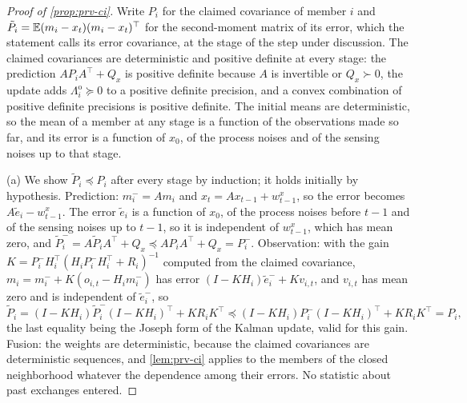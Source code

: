 \begin{proof}[Proof of \cref{prop:prv-ci}]
Write $P_{i}$ for the claimed covariance of member $i$ and $\tilde P_{i}=\mathbb{E}(m_i-x_t)(m_i-x_t)^\top$ for the second-moment matrix of its error, which the statement calls its error covariance, at the stage of the step under discussion. The claimed covariances are deterministic and positive definite at every stage: the prediction $AP_iA^\top+Q_x$ is positive definite because $A$ is invertible or $Q_x\succ0$, the update adds $\Lambda^{\mathrm o}_i\succeq0$ to a positive definite precision, and a convex combination of positive definite precisions is positive definite. The initial means are deterministic, so the mean of a member at any stage is a function of the observations made so far, and its error is a function of $x_0$, of the process noises and of the sensing noises up to that stage.

(a) We show $\tilde P_i\preceq P_i$ after every stage by induction; it holds initially by hypothesis. Prediction: $m_i^-=Am_i$ and $x_{t}=Ax_{t-1}+w^x_{t-1}$, so the error becomes $A\tilde e_i-w^x_{t-1}$. The error $\tilde e_i$ is a function of $x_0$, of the process noises before $t-1$ and of the sensing noises up to $t-1$, so it is independent of $w^x_{t-1}$, which has mean zero, and $\tilde P_i^-=A\tilde P_iA^\top+Q_x\preceq AP_iA^\top+Q_x=P_i^-$. Observation: with the gain $K=P_i^-H_i^\top(H_iP_i^-H_i^\top+R_i)^{-1}$ computed from the claimed covariance, $m_i=m_i^-+K(o_{i,t}-H_im_i^-)$ has error $(I-KH_i)\tilde e_i^-+Kv_{i,t}$, and $v_{i,t}$ has mean zero and is independent of $\tilde e_i^-$, so
\[
\tilde P_i=(I-KH_i)\tilde P_i^-(I-KH_i)^\top+KR_iK^\top\preceq(I-KH_i)P_i^-(I-KH_i)^\top+KR_iK^\top=P_i,
\]
the last equality being the Joseph form of the Kalman update, valid for this gain. Fusion: the weights are deterministic, because the claimed covariances are deterministic sequences, and \cref{lem:prv-ci} applies to the members of the closed neighborhood whatever the dependence among their errors. No statistic about past exchanges entered.


\end{proof}
